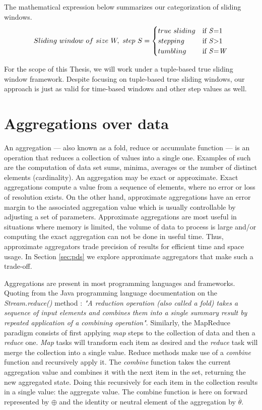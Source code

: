 The mathematical expression below summarizes our categorization of sliding windows.
\begin{equation} 
\label{math:windows}
  Sliding\ window \,\, of \,\, size \,\, W, \,\, step \,\, S =
    \begin{cases}
      true \,\, sliding & \text{if \textit{S}=1}\\
      stepping & \text{if \textit{S}>1}\\
      tumbling & \text{if \textit{S}=\textit{W}}
    \end{cases}
\end{equation}

For the scope of this Thesis, we will work under a tuple-based true sliding window framework. Despite focusing on tuple-based true sliding windows, our approach is just as valid for time-based windows and other step values as well.

\section{Aggregations over data} \label{sec:aggregations}

An aggregation --- also known as a fold, reduce or accumulate function --- is an operation that reduces a collection of values into a single one. Examples of such are the computation of data set sums, minima, averages or the number of distinct elements (cardinality). An aggregation may be exact or approximate. Exact aggregations compute a value from a sequence of elements, where no error or loss of resolution exists. On the other hand, approximate aggregations have an error margin to the associated aggregation value which is usually controllable by adjusting a set of parameters. 
Approximate aggregations are most useful in situations where memory is limited, the volume of data to process is large and/or computing the exact aggregation can not be done in useful time. Thus, approximate aggregators trade precision of results for efficient time and space usage. In Section \ref{sec:pds} we explore approximate aggregators that make such a trade-off.

Aggregations are present in most programming languages and frameworks. Quoting from the Java programming language documentation on the \textit{Stream.reduce()} method \cite{Java13StreamReduce}: 
\textit{"A reduction operation (also called a fold) takes a sequence of input elements and combines them into a single summary result by repeated application of a combining operation"}. Similarly, the MapReduce \cite{MapReduce} paradigm consists of first applying \textit{map} steps to the collection of data and then a \textit{reduce} one. \textit{Map} tasks will transform each item as desired and the \textit{reduce} task will merge the collection into a single value. Reduce methods make use of a \textit{combine} function and recursively apply it. The \textit{combine} function takes the current aggregation value and combines it with the next item in the set, returning the new aggregated state. Doing this recursively for each item in the collection results in a single value: the aggregate value. The combine function is here on forward represented by $\oplus$ and the identity or neutral element of the aggregation by $\overline{\theta}$.

